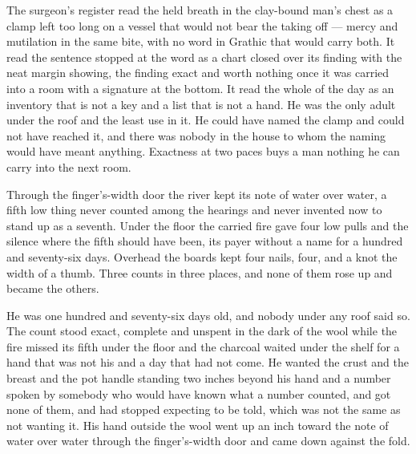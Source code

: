 The surgeon's register read the held breath in the clay-bound man's chest as a clamp left too long on a vessel that would not bear the taking off --- mercy and mutilation in the same bite, with no word in Grathic that would carry both. It read the sentence stopped at the word as a chart closed over its finding with the neat margin showing, the finding exact and worth nothing once it was carried into a room with a signature at the bottom. It read the whole of the day as an inventory that is not a key and a list that is not a hand. He was the only adult under the roof and the least use in it. He could have named the clamp and could not have reached it, and there was nobody in the house to whom the naming would have meant anything. Exactness at two paces buys a man nothing he can carry into the next room.

Through the finger's-width door the river kept its note of water over water, a fifth low thing never counted among the hearings and never invented now to stand up as a seventh. Under the floor the carried fire gave four low pulls and the silence where the fifth should have been, its payer without a name for a hundred and seventy-six days. Overhead the boards kept four nails, four, and a knot the width of a thumb. Three counts in three places, and none of them rose up and became the others.

He was one hundred and seventy-six days old, and nobody under any roof said so. The count stood exact, complete and unspent in the dark of the wool while the fire missed its fifth under the floor and the charcoal waited under the shelf for a hand that was not his and a day that had not come. He wanted the crust and the breast and the pot handle standing two inches beyond his hand and a number spoken by somebody who would have known what a number counted, and got none of them, and had stopped expecting to be told, which was not the same as not wanting it. His hand outside the wool went up an inch toward the note of water over water through the finger's-width door and came down against the fold.
